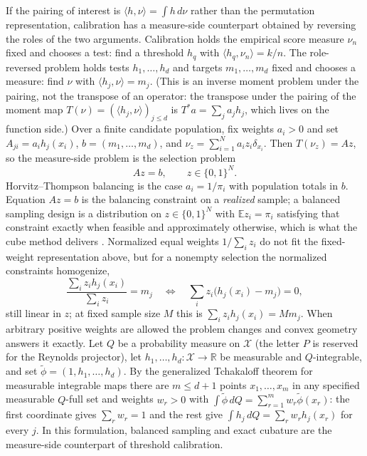 \documentclass[11pt]{article}
\theoremstyle{remark}
\newcommand{\R}{\mathbb{R}}
\newcommand{\E}{\mathbb{E}}
\begin{document}
If the pairing of interest is $\langle h,\nu\rangle=\int h\,d\nu$ rather than the permutation
representation, calibration has a measure-side counterpart obtained by reversing the roles of
the two arguments. Calibration holds the empirical score measure $\nu_n$ fixed and chooses a
test: find a threshold $h_q$ with $\langle h_q,\nu_n\rangle=k/n$. The role-reversed problem
holds tests $h_1,\dots,h_d$ and targets $m_1,\dots,m_d$ fixed and chooses a measure: find $\nu$
with $\langle h_j,\nu\rangle=m_j$. (This is an inverse moment problem under the pairing, not
the transpose of an operator: the transpose under the pairing of the moment map
$T(\nu)=(\langle h_j,\nu\rangle)_{j\le d}$ is $T^{*}a=\sum_j a_jh_j$, which lives on the
function side.) Over a finite candidate population, fix weights $a_i>0$ and set
$A_{ji}=a_ih_j(x_i)$, $b=(m_1,\dots,m_d)$, and
$\nu_z=\sum_{i=1}^{N}a_iz_i\delta_{x_i}$. Then $T(\nu_z)=Az$, so the measure-side problem is
the selection problem
\[
Az=b,\qquad z\in\{0,1\}^{N}.
\]
Horvitz--Thompson balancing is the case $a_i=1/\pi_i$ with population totals in $b$.
Equation $Az=b$ is the balancing constraint on a \emph{realized} sample; a balanced sampling
design is a distribution on $z\in\{0,1\}^N$ with $\E z_i=\pi_i$ satisfying that constraint
exactly when feasible and approximately otherwise, which is what the cube method delivers
\citep{devilletille2004}. Normalized equal weights $1/\sum_iz_i$ do not fit the fixed-weight
representation above, but for a nonempty selection the normalized constraints homogenize,
\[
\frac{\sum_iz_ih_j(x_i)}{\sum_iz_i}=m_j
\quad\Longleftrightarrow\quad
\sum_i z_i\bigl(h_j(x_i)-m_j\bigr)=0,
\]
still linear in $z$; at fixed sample size $M$ this is $\sum_iz_ih_j(x_i)=Mm_j$. When arbitrary positive
weights are allowed the problem changes and convex geometry answers it exactly. Let $Q$ be a
probability measure on $\mathcal X$ (the letter $P$ is reserved for the Reynolds projector),
let $h_1,\dots,h_d:\mathcal X\to\R$ be measurable and $Q$-integrable, and set
$\tilde\phi=(1,h_1,\dots,h_d)$. By the generalized Tchakaloff theorem for measurable
integrable maps \citep{tchakaloff1957,bayerteichmann2006} there are $m\le d+1$ points
$x_1,\dots,x_m$ in any specified measurable $Q$-full set and weights $w_r>0$ with
$\int\tilde\phi\,dQ=\sum_{r=1}^{m}w_r\tilde\phi(x_r)$: the first coordinate gives
$\sum_rw_r=1$ and the rest give $\int h_j\,dQ=\sum_rw_rh_j(x_r)$ for every $j$. In this formulation, balanced sampling and exact
cubature are the measure-side counterpart of threshold calibration.
\end{document}
